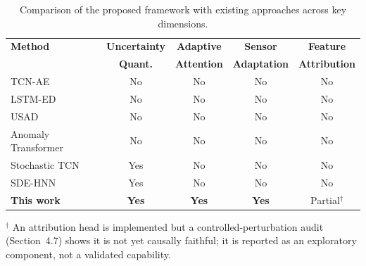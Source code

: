 \begin{table}[H]
\centering
\caption{Comparison of the proposed framework with existing approaches across key dimensions.}
\label{table:positioning}
\begin{tabular}{lcccc}
\toprule
\textbf{Method} & \textbf{Uncertainty} & \textbf{Adaptive} & \textbf{Sensor} & \textbf{Feature} \\
 & \textbf{Quant.} & \textbf{Attention} & \textbf{Adaptation} & \textbf{Attribution} \\
\midrule
TCN-AE~\cite{thill_temporal_2021} & No & No & No & No \\
LSTM-ED~\cite{malhotra2016lstmed} & No & No & No & No \\
USAD~\cite{audibert2020usad} & No & No & No & No \\
Anomaly Transformer~\cite{xu2022anomalytransformer} & No & No & No & No \\
Stochastic TCN~\cite{ghimire_electricity_2025} & Yes & No & No & No \\
SDE-HNN~\cite{cui_sde-hnn_2025} & Yes & No & No & No \\
\textbf{This work} & \textbf{Yes} & \textbf{Yes} & \textbf{Yes} & Partial$^{\dagger}$ \\
\bottomrule
\end{tabular}
\begin{flushleft}\footnotesize $^{\dagger}$ An attribution head is implemented but a controlled-perturbation audit (Section~4.7) shows it is not yet causally faithful; it is reported as an exploratory component, not a validated capability.\end{flushleft}
\end{table}
